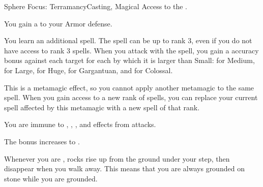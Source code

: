   \begin{magicalfeat}{Sphere Focus: Terramancy}{Casting, Magical}
    \featpre Access to the  .

     You gain a   to your Armor defense.

     You learn an additional spell.
    The spell can be up to rank 3, even if you do not have access to rank 3 spells.
    When you attack with the spell, you gain a  accuracy bonus against each target for each  by which it is larger than Small:  for Medium,  for Large,  for Huge,  for Gargantuan, and  for Colossal.

    This is a metamagic effect, so you cannot apply another metamagic to the same spell.
    When you gain access to a new rank of spells, you can replace your current spell affected by this metamagic with a new spell of that rank.

     You are immune to , , , and \prone effects from attacks.

     The bonus increases to .

     Whenever you are , rocks rise up from the ground under your step, then disappear when you walk away.
    This means that you are always grounded on stone while you are grounded.
  \end{magicalfeat}

